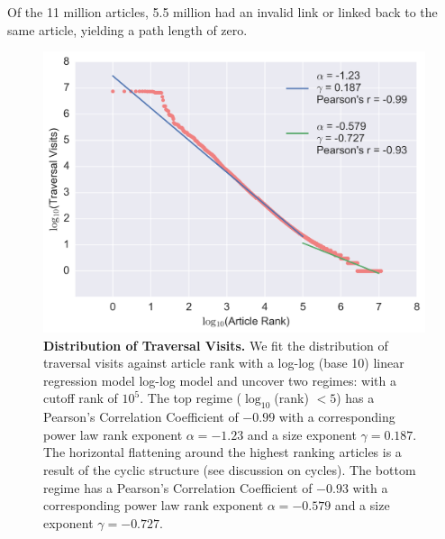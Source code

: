 Of the 11 million articles, 5.5 million had an invalid link or linked back to the same article, yielding a path length of zero. 
\begin{figure}[tp!]
  \includegraphics[width=\columnwidth]{graphics/traversals_per_article.png} 
  \caption{
    \textbf{Distribution of Traversal Visits.}
We fit the distribution of traversal visits against article rank with a log-log (base 10) linear regression model log-log model and uncover two regimes: 
with a cutoff rank of $10^{5}$.
The top regime ($\log_{10}$(rank) $< 5$) has a Pearson's Correlation 
Coefficient of $-0.99$ 
with a corresponding power law rank exponent 
$\alpha = -1.23$ and a size exponent $\gamma = 0.187$.
The horizontal flattening around the highest
ranking articles is a result of the cyclic structure (see discussion on cycles).
The bottom regime has a Pearson's Correlation Coefficient of $-0.93$
with a corresponding power law rank exponent 
$\alpha = -0.579$ and a size exponent $\gamma = -0.727$.}
  \label{fig:Distribution of Visits}

\end{figure}


